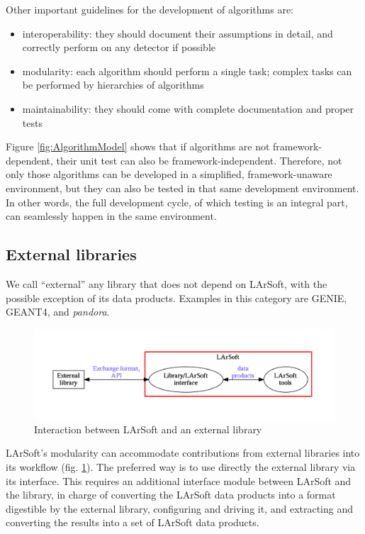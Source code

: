 Other important guidelines for the development of algorithms are:

\begin{itemize}
\item
  interoperability: they should document their assumptions in detail,
  and correctly perform on any detector if possible
\item
  modularity: each algorithm should perform a single task; complex tasks
  can be performed by hierarchies of algorithms
\item
  maintainability: they should come with complete documentation and
  proper tests
\end{itemize}

Figure \ref{fig:AlgorithmModel} shows that if algorithms are not
framework-dependent, their unit test can also be framework-independent.
Therefore, not only those algorithms can be developed in a simplified,
framework-unaware environment, but they can also be tested in that same
development environment. In other words, the full development cycle, of
which testing is an integral part, can seamlessly happen in the same
environment.

\subsection{External libraries}\label{external-libraries}

We call ``external'' any library that does not depend on LArSoft, with
the possible exception of its data products. Examples in this category
are GENIE, GEANT4, and \emph{pandora}.

\begin{figure}[htbp]
\centering
\includegraphics[width=\textwidth]{figures/LArSoftAndExternals.pdf}
\caption{\label{fig:LArSoftAndExternals}Interaction between LArSoft and
an external library}
\end{figure}

LArSoft's modularity can accommodate contributions from external
libraries into its workflow (fig. \ref{fig:LArSoftAndExternals}). The
preferred way is to use directly the external library via its interface.
This requires an additional interface module between LArSoft and the
library, in charge of converting the LArSoft data products into a format
digestible by the external library, configuring and driving it, and
extracting and converting the results into a set of LArSoft data
products.

